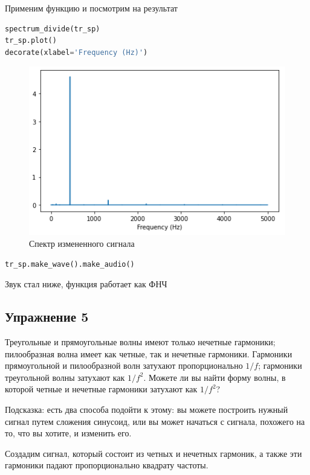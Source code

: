 Применим функцию и посмотрим на результат

\begin{lstlisting}[language=Python]
spectrum_divide(tr_sp)
tr_sp.plot()
decorate(xlabel='Frequency (Hz)')
\end{lstlisting}

\begin{figure}[H]
	\begin{center}
		\includegraphics[scale=1]{fig/lab02/lab02_11.png}
		\caption{Спектр измененного сигнала}
	\end{center}
\end{figure}

\begin{lstlisting}[language=Python]
tr_sp.make_wave().make_audio()
\end{lstlisting}

Звук стал ниже, функция работает как ФНЧ


\subsection{Упражнение 5}

Треугольные и прямоугольные волны имеют только нечетные гармоники; пилообразная волна имеет как четные, так и нечетные гармоники. Гармоники прямоугольной и пилообразной волн затухают пропорционально $1/f$; гармоники треугольной волны затухают как $1/f^2$. Можете ли вы найти форму волны, в которой четные и нечетные гармоники затухают как $1/f^2$?

\noindent Подсказка: есть два способа подойти к этому: вы можете построить нужный сигнал путем сложения синусоид, или вы может начаться с сигнала, похожего на то, что вы хотите, и изменить его.

Создадим сигнал, который состоит из четных и нечетных гармоник, а также эти гармоники падают пропорционально квадрату частоты.

